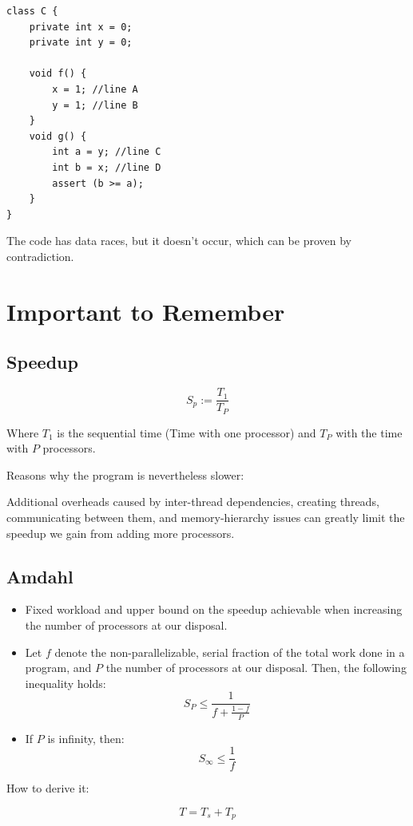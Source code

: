 \documentclass{article}
\begin{document}
\begin{lstlisting}
class C {
    private int x = 0;
    private int y = 0;

    void f() {
        x = 1; //line A
        y = 1; //line B
    }
    void g() {
        int a = y; //line C
        int b = x; //line D
        assert (b >= a);
    }
}
\end{lstlisting}

The code has data races, but it doesn't occur, which can be proven by contradiction.

\section{Important to Remember}

\subsection{Speedup}

\[S_p := \frac{T_1}{T_P}\]

Where \(T_1\) is the sequential time (Time with one processor) and \(T_P\) with the time with \(P\) processors.

Reasons why the program is nevertheless slower:

Additional overheads caused by inter-thread dependencies, creating threads, communicating between them, and memory-hierarchy issues can greatly limit the speedup we gain from adding more processors.

\subsection{Amdahl}

\begin{itemize}
    \item Fixed workload and upper bound on the speedup achievable when increasing the number of processors at our disposal.
    \item Let \(f\) denote the non-parallelizable, serial fraction of the total work done in a program, and \(P\) the number of processors at our disposal. Then, the following inequality holds:
    \[S_P \leq \frac{1}{f + \frac{1 - f}{P}}\]
    \item If \(P\) is infinity, then:
    \[S_\infty \leq \frac{1}{f}\]
\end{itemize}

How to derive it:

\[T = T_s + T_p\]
\end{document}
